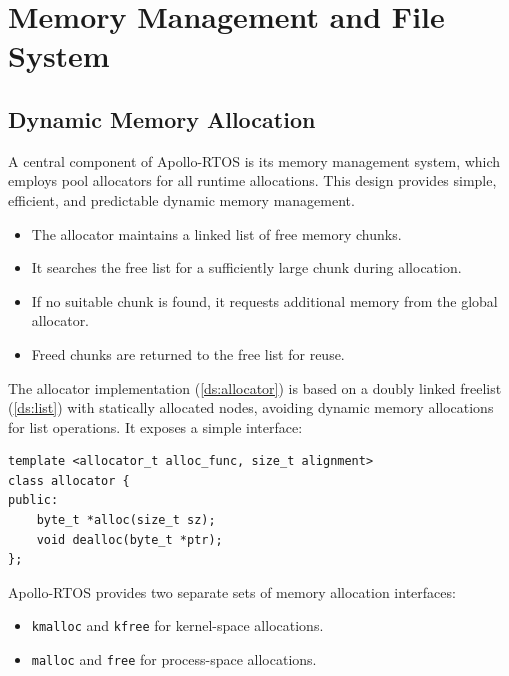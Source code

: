 \section{Memory Management and File System}
\label{sec:memory}

\subsection{Dynamic Memory Allocation}
\label{sec:mem}

A central component of Apollo-RTOS is its memory management system, which employs pool
allocators for all runtime allocations. This design provides simple, efficient, and
predictable dynamic memory management.

\begin{emptythm}
    \begin{itemize}[left=1em]
        \item The allocator maintains a linked list of free memory chunks.
        \item It searches the free list for a sufficiently large chunk during
            allocation.
        \item If no suitable chunk is found, it requests additional memory from the
            global allocator.
        \item Freed chunks are returned to the free list for reuse.
    \end{itemize}
\end{emptythm}

The allocator implementation (\autoref{ds:allocator}) is based on a doubly linked
freelist (\autoref{ds:list}) with statically allocated nodes, avoiding dynamic memory
allocations for list operations. It exposes a simple interface:

\begin{lstlisting}[style=myagc]
template <allocator_t alloc_func, size_t alignment>
class allocator {
public:
    byte_t *alloc(size_t sz);
    void dealloc(byte_t *ptr);
};
\end{lstlisting}

Apollo-RTOS provides two separate sets of memory allocation interfaces:
\begin{itemize}
    \item \lstinline[style=myagc]|kmalloc| and \lstinline[style=myagc]|kfree| for
        kernel-space allocations.
    \item \lstinline[style=myagc]|malloc| and \lstinline[style=myagc]|free| for
        process-space allocations.
\end{itemize}

